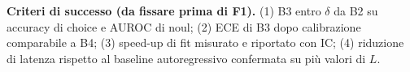 \documentclass[11pt,a4paper]{article}
\begin{document}
\textbf{Criteri di successo (da fissare prima di F1).} (1) B3 entro $\delta$ da B2 su accuracy di choice e AUROC di noul; (2) ECE di B3 dopo calibrazione comparabile a B4; (3) speed-up di fit misurato e riportato con IC; (4) riduzione di latenza rispetto al baseline autoregressivo confermata su più valori di $L$.
\end{document}
